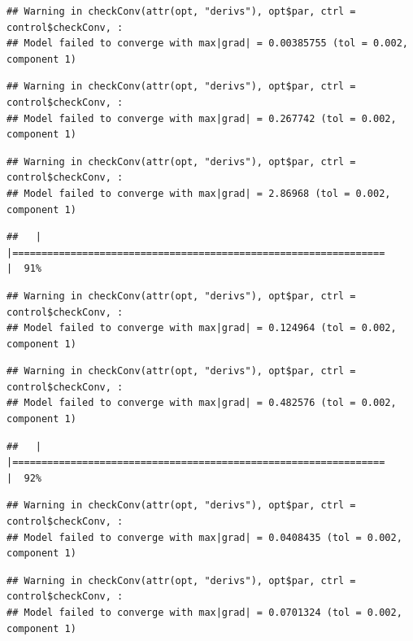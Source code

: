 \documentclass[
  12pt,
]{book}
\begin{document}
\begin{verbatim}
## Warning in checkConv(attr(opt, "derivs"), opt$par, ctrl = control$checkConv, :
## Model failed to converge with max|grad| = 0.00385755 (tol = 0.002, component 1)
\end{verbatim}

\begin{verbatim}
## Warning in checkConv(attr(opt, "derivs"), opt$par, ctrl = control$checkConv, :
## Model failed to converge with max|grad| = 0.267742 (tol = 0.002, component 1)
\end{verbatim}

\begin{verbatim}
## Warning in checkConv(attr(opt, "derivs"), opt$par, ctrl = control$checkConv, :
## Model failed to converge with max|grad| = 2.86968 (tol = 0.002, component 1)
\end{verbatim}

\begin{verbatim}
##   |                                                                              |================================================================      |  91%
\end{verbatim}

\begin{verbatim}
## Warning in checkConv(attr(opt, "derivs"), opt$par, ctrl = control$checkConv, :
## Model failed to converge with max|grad| = 0.124964 (tol = 0.002, component 1)
\end{verbatim}

\begin{verbatim}
## Warning in checkConv(attr(opt, "derivs"), opt$par, ctrl = control$checkConv, :
## Model failed to converge with max|grad| = 0.482576 (tol = 0.002, component 1)
\end{verbatim}

\begin{verbatim}
##   |                                                                              |================================================================      |  92%
\end{verbatim}

\begin{verbatim}
## Warning in checkConv(attr(opt, "derivs"), opt$par, ctrl = control$checkConv, :
## Model failed to converge with max|grad| = 0.0408435 (tol = 0.002, component 1)
\end{verbatim}

\begin{verbatim}
## Warning in checkConv(attr(opt, "derivs"), opt$par, ctrl = control$checkConv, :
## Model failed to converge with max|grad| = 0.0701324 (tol = 0.002, component 1)
\end{verbatim}
\end{document}
